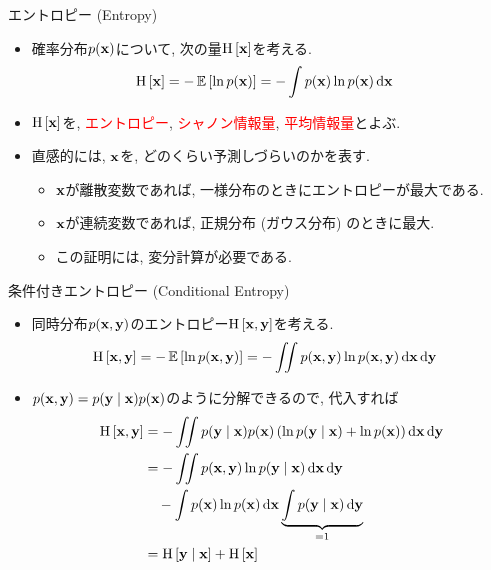 \documentclass[dvipdfmx,notheorems,t]{beamer}
\begin{document}
\begin{frame}{エントロピー (Entropy)}
\begin{itemize}
  \item 確率分布$p(\vb{x})$について, 次の量$\operatorname{H} \left[ \vb{x} \right]$を考える.
  \begin{align*}
    \operatorname{H} \left[ \vb{x} \right] &= -\operatorname{\mathbb{E}} \left[ \ln p(\vb{x}) \right] = - \int p(\vb{x}) \ln p(\vb{x}) \dd{\vb{x}}
  \end{align*}
  \item $\operatorname{H} \left[ \vb{x} \right]$を, \textcolor{red}{エントロピー}, \textcolor{red}{シャノン情報量}, \textcolor{red}{平均情報量}とよぶ.
  \item 直感的には, $\vb{x}$を, どのくらい予測しづらいのかを表す.
  \begin{itemize}
    \item $\vb{x}$が離散変数であれば, 一様分布のときにエントロピーが最大である.
    \item $\vb{x}$が連続変数であれば, 正規分布 (ガウス分布) のときに最大.
    \item この証明には, 変分計算が必要である.
  \end{itemize}
\end{itemize}
\end{frame}

\begin{frame}{条件付きエントロピー (Conditional Entropy)}
\begin{itemize}
  \item 同時分布$p(\vb{x}, \vb{y})$のエントロピー$\operatorname{H} \left[ \vb{x}, \vb{y} \right]$を考える.
  \begin{align*}
    \operatorname{H} \left[ \vb{x}, \vb{y} \right] &= -\operatorname{\mathbb{E}} \left[ \ln p(\vb{x}, \vb{y}) \right]
      = - \iint p(\vb{x}, \vb{y}) \ln p(\vb{x}, \vb{y}) \dd{\vb{x}} \dd{\vb{y}}
  \end{align*}
  \item $p(\vb{x}, \vb{y}) = p(\vb{y} \mid \vb{x}) p(\vb{x})$のように分解できるので, 代入すれば
  \begin{align*}
    \operatorname{H} \left[ \vb{x}, \vb{y} \right]
      &= - \iint p(\vb{y} \mid \vb{x}) p(\vb{x})
        \left( \ln p(\vb{y} \mid \vb{x}) + \ln p(\vb{x}) \right) \dd{\vb{x}} \dd{\vb{y}} \\
      &= - \iint p(\vb{x}, \vb{y}) \ln p(\vb{y} \mid \vb{x}) \dd{\vb{x}} \dd{\vb{y}} \\
      & \quad - \int p(\vb{x}) \ln p(\vb{x}) \dd{\vb{x}}
        \underbrace{\int p(\vb{y} \mid \vb{x}) \dd{\vb{y}}}_{=1} \\
      &= \operatorname{H} \left[ \vb{y} \mid \vb{x} \right] + \operatorname{H} \left[ \vb{x} \right]
  \end{align*}
\end{itemize}
\end{frame}
\end{document}
